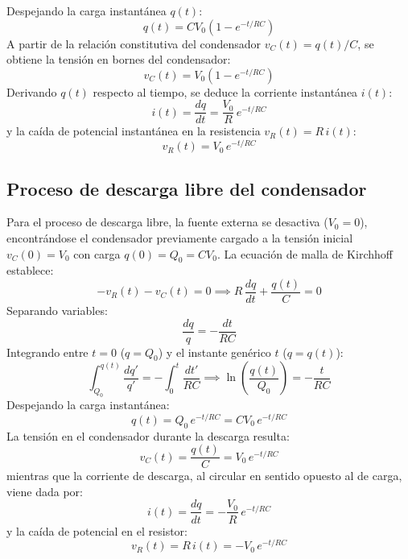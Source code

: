 \begin{appendices}
\begin{equation}
\end{equation}
Despejando la carga instantánea $q(t)$:
\begin{equation}
    \boxed{q(t) = C V_0 \left( 1 - e^{-t / RC} \right)}
\end{equation}
A partir de la relación constitutiva del condensador $v_C(t) = q(t) / C$, se obtiene la tensión en bornes del condensador:
\begin{equation}
    \boxed{v_C(t) = V_0 \left( 1 - e^{-t / RC} \right)}
\end{equation}
Derivando $q(t)$ respecto al tiempo, se deduce la corriente instantánea $i(t)$:
\begin{equation}
    \boxed{i(t) = \frac{dq}{dt} = \frac{V_0}{R}\,e^{-t / RC}}
\end{equation}
y la caída de potencial instantánea en la resistencia $v_R(t) = R\,i(t)$:
\begin{equation}
    \boxed{v_R(t) = V_0\,e^{-t / RC}}
\end{equation}

\subsection{Proceso de descarga libre del condensador}

Para el proceso de descarga libre, la fuente externa se desactiva ($V_0 = 0$), encontrándose el condensador previamente cargado a la tensión inicial $v_C(0) = V_0$ con carga $q(0) = Q_0 = C V_0$. La ecuación de malla de Kirchhoff establece:
\begin{equation}
    -v_R(t) - v_C(t) = 0 \implies R\,\frac{dq}{dt} + \frac{q(t)}{C} = 0
\end{equation}
Separando variables:
\begin{equation}
    \frac{dq}{q} = -\frac{dt}{RC}
\end{equation}
Integrando entre $t = 0$ ($q = Q_0$) y el instante genérico $t$ ($q = q(t)$):
\begin{equation}
    \int_{Q_0}^{q(t)} \frac{dq'}{q'} = -\int_{0}^{t} \frac{dt'}{RC} \implies \ln\left(\frac{q(t)}{Q_0}\right) = -\frac{t}{RC}
\end{equation}
Despejando la carga instantánea:
\begin{equation}
    \boxed{q(t) = Q_0\,e^{-t / RC} = C V_0\,e^{-t / RC}}
\end{equation}
La tensión en el condensador durante la descarga resulta:
\begin{equation}
    \boxed{v_C(t) = \frac{q(t)}{C} = V_0\,e^{-t / RC}}
\end{equation}
mientras que la corriente de descarga, al circular en sentido opuesto al de carga, viene dada por:
\begin{equation}
    \boxed{i(t) = \frac{dq}{dt} = -\frac{V_0}{R}\,e^{-t / RC}}
\end{equation}
y la caída de potencial en el resistor:
\begin{equation}
    \boxed{v_R(t) = R\,i(t) = -V_0\,e^{-t / RC}}
\end{equation}


\end{appendices}
